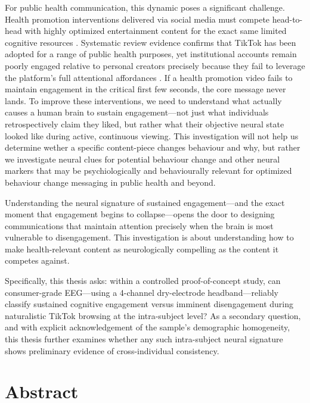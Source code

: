 \documentclass[12pt,a4paper]{report}
\begin{document}
For public health communication, this dynamic poses a significant challenge. Health promotion interventions delivered via social media must compete head-to-head with highly optimized entertainment content for the exact same limited cognitive resources \cite{mccashin_using_2023}. Systematic review evidence confirms that TikTok has been adopted for a range of public health purposes, yet institutional accounts remain poorly engaged relative to personal creators precisely because they fail to leverage the platform's full attentional affordances \cite{mccashin_using_2023}. If a health promotion video fails to maintain engagement in the critical first few seconds, the core message never lands. To improve these interventions, we need to understand what actually causes a human brain to sustain engagement---not just what individuals retrospectively claim they liked, but rather what their objective neural state looked like during active, continuous viewing. This investigation will not help us determine wether a specific content-piece changes behaviour and why, but rather we investigate neural clues for potential behaviour change and other neural markers that may be psychiologically and behaviourally relevant for optimized behaviour change messaging in public health and beyond.

Understanding the neural signature of sustained engagement---and the exact moment that engagement begins to collapse---opens the door to designing communications that maintain attention precisely when the brain is most vulnerable to disengagement. This investigation is about understanding how to make health-relevant content as neurologically compelling as the content it competes against.

Specifically, this thesis asks: within a controlled proof-of-concept study, can consumer-grade EEG---using a 4-channel dry-electrode headband---reliably classify sustained cognitive engagement versus imminent disengagement during naturalistic TikTok browsing at the intra-subject level? As a secondary question, and with explicit acknowledgement of the sample's demographic homogeneity, this thesis further examines whether any such intra-subject neural signature shows preliminary evidence of cross-individual consistency.
\fi

\chapter*{Abstract}
\end{document}
